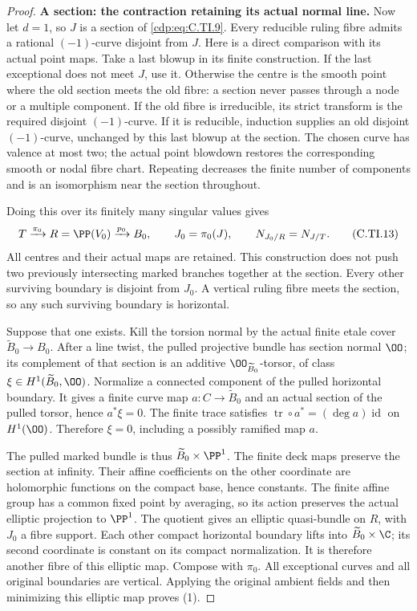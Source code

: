 \begin{proof}
\par\medskip\noindent\textbf{A section: the contraction retaining its actual normal line.}
Now let \(d=1\), so \(J\) is a section
of \eqref{cdp:eq:C.TI.9}. Every reducible ruling
fibre admits a rational \((-1)\)-curve
disjoint from \(J\). Here is a direct
comparison with its actual point maps.
Take a last blowup in its finite
construction. If the last exceptional
does not meet \(J\), use it. Otherwise
the centre is the smooth point where
the old section meets the old fibre:
a section never passes through a
node or a multiple component.
If the old fibre is irreducible,
its strict transform is the required
disjoint \((-1)\)-curve. If it is
reducible, induction supplies an old
disjoint \((-1)\)-curve, unchanged
by this last blowup at the section.
The chosen curve has valence at most
two; the actual point blowdown
restores the corresponding smooth
or nodal fibre chart. Repeating
decreases the finite number of
components and is an isomorphism
near the section throughout.

Doing this over its finitely many
singular values gives
\[
 T\xrightarrow{\pi_0}R=\PP(V_0)
                    \xrightarrow{p_0}B_0,
 \qquad J_0=\pi_0(J),
 \qquad N_{J_0/R}=N_{J/T}.
 \tag{C.TI.13}\label{cdp:eq:C.TI.13}
\]
All centres and their actual maps
are retained. This construction
does not push two previously
intersecting marked branches
together at the section.
Every other surviving boundary
is disjoint from \(J_0\).
A vertical ruling fibre meets
the section, so any such surviving
boundary is horizontal.

Suppose that one exists. Kill the
torsion normal by the actual finite
etale cover \(\widetilde B_0\to B_0\).
After a line twist, the pulled
projective bundle has section
normal \(\OO\); its complement
of that section is an additive
\(\OO_{\widetilde B_0}\)-torsor,
of class
\(\xi\in H^1(\widetilde B_0,\OO)\).
Normalize a connected component
of the pulled horizontal boundary.
It gives a finite curve map
\(a:C\to\widetilde B_0\) and an
actual section of the pulled
torsor, hence \(a^*\xi=0\).
The finite trace satisfies
\(\operatorname{tr}\circ a^*
 =(\deg a)\operatorname{id}\)
on \(H^1(\OO)\). Therefore
\(\xi=0\), including a possibly
ramified map \(a\).

The pulled marked bundle is thus
\(\widetilde B_0\times\PP^1\).
The finite deck maps preserve the
section at infinity. Their affine
coefficients on the other coordinate
are holomorphic functions on the
compact base, hence constants.
The finite affine group has a
common fixed point by averaging,
so its action preserves the actual
elliptic projection to \(\PP^1\).
The quotient gives an elliptic
quasi-bundle on \(R\), with \(J_0\)
a fibre support. Each other compact
horizontal boundary lifts into
\(\widetilde B_0\times\C\); its
second coordinate is constant
on its compact normalization.
It is therefore another fibre
of this elliptic map. Compose
with \(\pi_0\). All exceptional
curves and all original boundaries
are vertical. Applying the original
ambient fields and then minimizing
this elliptic map proves (1).


\end{proof}

